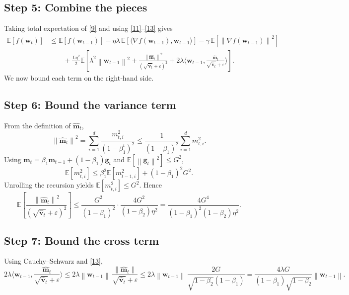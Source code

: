 \documentclass{article}
\newcommand{\E}{\mathbb{E}}
\newcommand{\norm}[1]{\left\|#1\right\|}
\begin{document}
\subsection*{Step 5: Combine the pieces}
Taking total expectation of \eqref{9} and using \eqref{11}–\eqref{13} gives
\begin{align}
    \E[f(\bm w_t)] &\le \E[f(\bm w_{t-1})]
    -\eta\lambda\,\E\!\left[\langle\nabla f(\bm w_{t-1}),\bm w_{t-1}\rangle\right]
    -\gamma\,\E\!\left[\norm{\nabla f(\bm w_{t-1})}^{2}\right] \nonumber\\
    &\qquad
    +\frac{L\eta^{2}}{2}\E\!\left[
        \lambda^{2}\norm{\bm w_{t-1}}^{2}
        +\frac{\norm{\hat{\bm m}_{t}}^{2}}{(\sqrt{\hat{\bm v}_{t}}+\varepsilon)^{2}}
        +2\lambda\langle\bm w_{t-1},\frac{\hat{\bm m}_{t}}{\sqrt{\hat{\bm v}_{t}}+\varepsilon}\rangle
    \right].
\tag{15}
\end{align}
We now bound each term on the right‑hand side.

\subsection*{Step 6: Bound the variance term}
From the definition of $\hat{\bm m}_{t}$,
\[
    \norm{\hat{\bm m}_{t}}^{2}
    =\sum_{i=1}^{d}\frac{m_{t,i}^{2}}{(1-\beta_{1}^{t})^{2}}
    \le \frac{1}{(1-\beta_{1})^{2}}\sum_{i=1}^{d} m_{t,i}^{2}.
\]
Using $\bm m_{t}= \beta_{1}\bm m_{t-1}+(1-\beta_{1})\bm g_{t}$ and $\E[\norm{\bm g_t}^{2}]\le G^{2}$,
\[
    \E[m_{t,i}^{2}]\le \beta_{1}^{2}\E[m_{t-1,i}^{2}] + (1-\beta_{1})^{2}G^{2}.
\]
Unrolling the recursion yields $\E[m_{t,i}^{2}]\le G^{2}$. Hence
\[
    \E\!\left[\frac{\norm{\hat{\bm m}_{t}}^{2}}{(\sqrt{\hat{\bm v}_{t}}+\varepsilon)^{2}}\right]
    \le \frac{G^{2}}{(1-\beta_{1})^{2}}\cdot\frac{4G^{2}}{(1-\beta_{2})\eta^{2}}
    =\frac{4G^{4}}{(1-\beta_{1})^{2}(1-\beta_{2})\eta^{2}}.
\tag{16}
\]

\subsection*{Step 7: Bound the cross term}
Using Cauchy–Schwarz and \eqref{13},
\[
    2\lambda\langle\bm w_{t-1},\frac{\hat{\bm m}_{t}}{\sqrt{\hat{\bm v}_{t}}+\varepsilon}\rangle
    \le 2\lambda\norm{\bm w_{t-1}}\,
       \frac{\norm{\hat{\bm m}_{t}}}{\sqrt{\hat{\bm v}_{t}}+\varepsilon}
    \le 2\lambda\norm{\bm w_{t-1}}\,
       \frac{2G}{\sqrt{1-\beta_{2}}(1-\beta_{1})}
    =\frac{4\lambda G}{(1-\beta_{1})\sqrt{1-\beta_{2}}}\norm{\bm w_{t-1}} .
\tag{17}
\]
\end{document}
